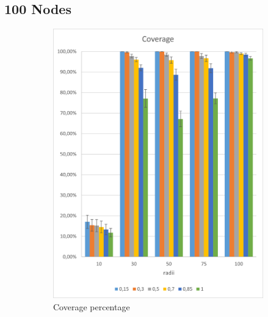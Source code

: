 \subsection{100 Nodes}
\begin{figure}[H]
\centering
\begin{subfigure}{.5\textwidth}
  \centering
  \includegraphics[width=1\linewidth]{./images/100CoverageCI.png}
  \caption{Coverage percentage}
  \label{fig:sub1}
\end{subfigure}%
\begin{subfigure}{.5\textwidth}
  \centering

\end{subfigure}
\end{figure}
